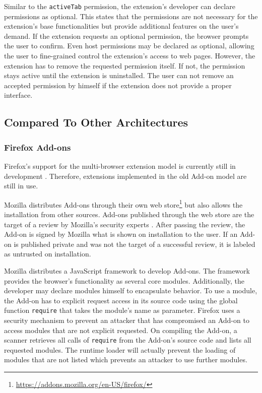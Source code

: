 	Similar to the \texttt{activeTab} permission, the extension's developer can declare permissions as optional. This states that the permissions are not necessary for the extension's base functionalities but provide additional features on the user's demand. If the extension requests an optional permission, the browser prompts the user to confirm. Even host permissions may be declared as optional, allowing the user to fine-grained control the extension's access to web pages. However, the extension has to remove the requested permission itself. If not, the permission stays active until the extension is uninstalled. The user can not remove an accepted permission by himself if the extension does not provide a proper interface. 

\subsection{Compared To Other Architectures}



\subsubsection{Firefox Add-ons}
	
	Firefox's support for the multi-browser extension model is currently still in development \cite{mozillaWebExtensionStatus}. Therefore, extensions implemented in the old Add-on model are still in use. 
	
	Mozilla distributes Add-ons through their own web store\footnote{\url{https://addons.mozilla.org/en-US/firefox/}} but also allows the installation from other sources. Add-ons published through the web store are the target of a review by Mozilla's security experts \cite{mozillaDevReviewPolicy}. After passing the review, the Add-on is signed by Mozilla what is shown on installation to the user. If an Add-on is published private and was not the target of a successful review, it is labeled as untrusted on installation. 
	
	Mozilla distributes a JavaScript framework to develop Add-ons. The framework provides the browser's functionality as several core modules. Additionally, the developer may declare modules himself to encapsulate behavior. To use a module, the Add-on has to explicit request access in its source code using the global function \texttt{require} that takes the module's name as parameter. Firefox uses a security mechanism to prevent an attacker that has compromised an Add-on to access modules that are not explicit requested. On compiling the Add-on, a scanner retrieves all calls of \texttt{require} from the Add-on's source code and lists all requested modules. The runtime loader will actually prevent the loading of modules that are not listed which prevents an attacker to use further modules.
	
